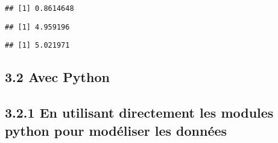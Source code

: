 \documentclass[]{article}
\newenvironment{Shaded}{\begin{snugshade}}{\end{snugshade}}
\newcommand{\DecValTok}[1]{\textcolor[rgb]{0.00,0.00,0.81}{#1}}
\newcommand{\KeywordTok}[1]{\textcolor[rgb]{0.13,0.29,0.53}{\textbf{#1}}}
\newcommand{\NormalTok}[1]{#1}
\newcommand{\OperatorTok}[1]{\textcolor[rgb]{0.81,0.36,0.00}{\textbf{#1}}}
\newcommand{\StringTok}[1]{\textcolor[rgb]{0.31,0.60,0.02}{#1}}
\begin{document}
\begin{Shaded}
\end{Shaded}

\begin{verbatim}
## [1] 0.8614648
\end{verbatim}

\begin{Shaded}
\end{Shaded}

\begin{verbatim}
## [1] 4.959196
\end{verbatim}

\begin{Shaded}
\end{Shaded}

\begin{verbatim}
## [1] 5.021971
\end{verbatim}

\hypertarget{avec-python}{%
\subsection{3.2 Avec Python}\label{avec-python}}

\hypertarget{en-utilisant-directement-les-modules-python-pour-modeliser-les-donnees}{%
\subsection{3.2.1 En utilisant directement les modules python pour
modéliser les
données}\label{en-utilisant-directement-les-modules-python-pour-modeliser-les-donnees}}
\end{document}
